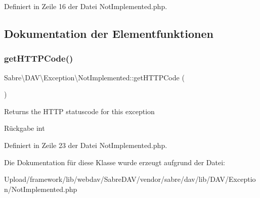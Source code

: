 Definiert in Zeile 16 der Datei Not\+Implemented.\+php.



\subsection{Dokumentation der Elementfunktionen}
\mbox{\label{class_sabre_1_1_d_a_v_1_1_exception_1_1_not_implemented_aeed59f93343d505ca00d20720f179c8b}} 
\subsubsection{\texorpdfstring{get\+H\+T\+T\+P\+Code()}{getHTTPCode()}}
{\footnotesize\ttfamily Sabre\textbackslash{}\+D\+A\+V\textbackslash{}\+Exception\textbackslash{}\+Not\+Implemented\+::get\+H\+T\+T\+P\+Code (\begin{DoxyParamCaption}{ }\end{DoxyParamCaption})}

Returns the H\+T\+TP statuscode for this exception

\begin{DoxyReturn}{Rückgabe}
int 
\end{DoxyReturn}


Definiert in Zeile 23 der Datei Not\+Implemented.\+php.



Die Dokumentation für diese Klasse wurde erzeugt aufgrund der Datei\+:\begin{DoxyCompactItemize}
\item 
Upload/framework/lib/webdav/\+Sabre\+D\+A\+V/vendor/sabre/dav/lib/\+D\+A\+V/\+Exception/Not\+Implemented.\+php\end{DoxyCompactItemize}
